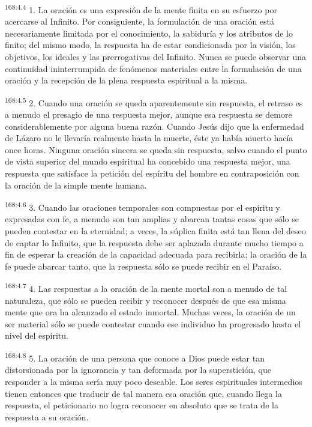 \par 
\textsuperscript{168:4.4} 1. La oración es una expresión de la mente finita en su esfuerzo por acercarse al Infinito. Por consiguiente, la formulación de una oración está necesariamente limitada por el conocimiento, la sabiduría y los atributos de lo finito; del mismo modo, la respuesta ha de estar condicionada por la visión, los objetivos, los ideales y las prerrogativas del Infinito. Nunca se puede observar una continuidad ininterrumpida de fenómenos materiales entre la formulación de una oración y la recepción de la plena respuesta espiritual a la misma.

\par 
\textsuperscript{168:4.5} 2. Cuando una oración se queda aparentemente sin respuesta, el retraso es a menudo el presagio de una respuesta mejor, aunque esa respuesta se demore considerablemente por alguna buena razón. Cuando Jesús dijo que la enfermedad de Lázaro no le llevaría realmente hasta la muerte, éste ya había muerto hacía once horas. Ninguna oración sincera se queda sin respuesta, salvo cuando el punto de vista superior del mundo espiritual ha concebido una respuesta mejor, una respuesta que satisface la petición del espíritu del hombre en contraposición con la oración de la simple mente humana.

\par 
\textsuperscript{168:4.6} 3. Cuando las oraciones temporales son compuestas por el espíritu y expresadas con fe, a menudo son tan amplias y abarcan tantas cosas que sólo se pueden contestar en la eternidad; a veces, la súplica finita está tan llena del deseo de captar lo Infinito, que la respuesta debe ser aplazada durante mucho tiempo a fin de esperar la creación de la capacidad adecuada para recibirla; la oración de la fe puede abarcar tanto, que la respuesta sólo se puede recibir en el Paraíso.

\par 
\textsuperscript{168:4.7} 4. Las respuestas a la oración de la mente mortal son a menudo de tal naturaleza, que sólo se pueden recibir y reconocer después de que esa misma mente que ora ha alcanzado el estado inmortal. Muchas veces, la oración de un ser material sólo se puede contestar cuando ese individuo ha progresado hasta el nivel del espíritu.

\par 
\textsuperscript{168:4.8} 5. La oración de una persona que conoce a Dios puede estar tan distorsionada por la ignorancia y tan deformada por la superstición, que responder a la misma sería muy poco deseable. Los seres espirituales intermedios tienen entonces que traducir de tal manera esa oración que, cuando llega la respuesta, el peticionario no logra reconocer en absoluto que se trata de la respuesta a su oración.

